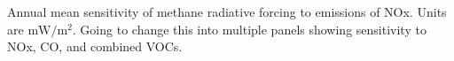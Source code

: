 Annual mean sensitivity of methane radiative forcing to emissions of NOx. Units are $\mathrm{mW/m^2}$. Going to change this into multiple panels showing sensitivity to NOx, CO, and combined VOCs. \label{fig:drfdenox}